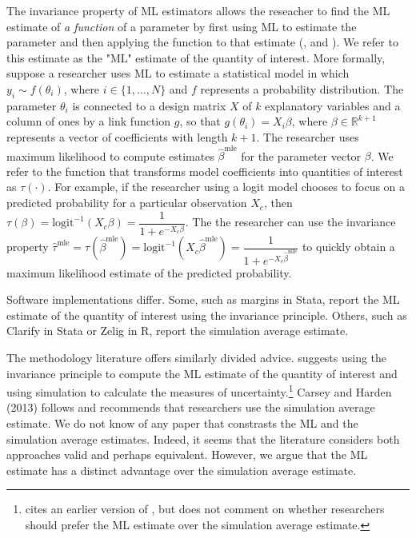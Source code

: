 \documentclass[11pt]{article}
\begin{document}
The invariance property of ML estimators allows the reseacher to find the ML estimate of \textit{a function} of a parameter by first using ML to estimate the parameter and then applying the function to that estimate (\citealt[pp. 75-76]{King1989}, and \citealt[pp. 320-321]{CasellaBerger2002}).
We refer to this estimate as the "ML" estimate of the quantity of interest.
More formally, suppose a researcher uses ML to estimate a statistical model in which $y_i {\sim} f(\theta_i)$, where $i \in \{1,\ldots, N\}$ and $f$ represents a probability distribution. 
The parameter $\theta_i$ is connected to a design matrix $X$ of $k$ explanatory variables and a column of ones by a link function $g$, so that $g(\theta_i) = X_i\beta$, where $\beta \in \mathbb{R}^{k+1}$ represents a vector of coefficients with length $k + 1$.
The researcher uses maximum likelihood to compute estimates $\hat{\beta}^{\text{mle}}$ for the parameter vector $\beta$.
We refer to the function that transforms model coefficients into quantities of interest as $\tau(\cdot)$.
For example, if the researcher using a logit model chooses to focus on a predicted probability for a particular observation $X_c$, then $\tau(\beta) = \text{logit}^{-1}( X_c \beta) = \dfrac{1}{1 + e^{-X_c\beta}}$. 
The the researcher can use the invariance property $\hat{\tau}^{\text{mle}} = \tau \left( \hat{\beta}^{\text{mle}}\right) = \text{logit}^{-1} \left( X_c \hat{\beta}^{\text{mle}} \right) = \dfrac{1}{1 + e^{-X_c \hat{\beta}^{\text{mle}}}}$ to quickly obtain a maximum likelihood estimate of the predicted probability.

Software implementations differ.
Some, such as margins in Stata, report the ML estimate of the quantity of interest using the invariance principle. 
Others, such as Clarify in Stata or Zelig in R, report the simulation average estimate.

The methodology literature offers similarly divided advice.
\cite{Herron1999} suggests using the invariance principle to compute the ML estimate of the quantity of interest and using simulation to calculate the measures of uncertainty.\footnote{\cite{Herron1999} cites an earlier version of \cite{KingTomzWittenberg2000}, but does not comment on whether researchers should prefer the ML estimate over the simulation average estimate.}
Carsey and Harden (2013) follows \cite{KingTomzWittenberg2000} and recommends that researchers use the simulation average estimate.
We do not know of any paper that constrasts the ML and the simulation average estimates. 
Indeed, it seems that the literature considers both approaches valid and perhaps equivalent.
However, we argue that the ML estimate has a distinct advantage over the simulation average estimate.
\end{document}
